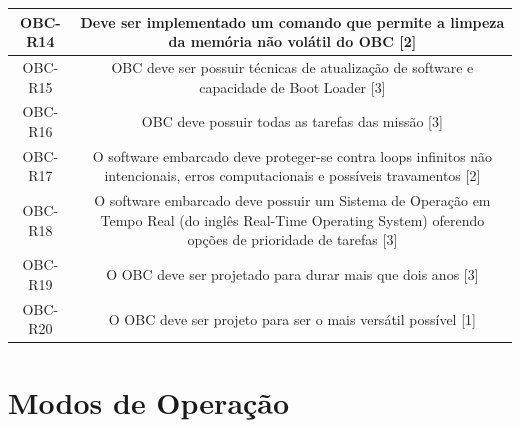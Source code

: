 \begin{apendicesenv}
\begin{table}[h]
{{{\begin{tabular}{ccc}
OBC-R14 &	\multicolumn{2}{p{13cm}}{\raggedright Deve ser implementado um comando que permite a limpeza da memória não volátil do OBC [2]}\\ \hline
OBC-R15 &	\multicolumn{2}{p{13cm}}{\raggedright OBC deve ser possuir técnicas de atualização de software e capacidade de Boot Loader [3]}\\ \hline
OBC-R16  &	\multicolumn{2}{p{13cm}}{\raggedright OBC deve possuir todas as tarefas das missão [3]}\\ \hline
OBC-R17  &	\multicolumn{2}{p{13cm}}{\raggedright O software embarcado deve proteger-se contra loops infinitos não intencionais, erros computacionais e possíveis travamentos [2]}\\ \hline
OBC-R18  &	\multicolumn{2}{p{13cm}}{\raggedright O software embarcado deve possuir um Sistema de Operação em Tempo Real (do inglês Real-Time Operating System) oferendo opções de prioridade de tarefas [3]}\\ \hline
OBC-R19  &	\multicolumn{2}{p{13cm}}{\raggedright O OBC deve ser projetado para durar mais que dois anos [3]}\\ \hline
OBC-R20  &	\multicolumn{2}{p{13cm}}{\raggedright O OBC deve ser projeto para ser o mais versátil possível [1]}\\ \hline
	
    \end{tabular}}}}
\end{table}


\chapter{Modos de Operação}
\label{apendicec}



\end{apendicesenv}
